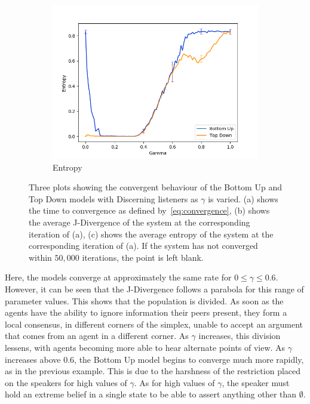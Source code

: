 \begin{figure}
\begin{subfigure}[ht]{0.45\textwidth}
    \includegraphics[width=\textwidth]{Images/Figures/BU+TD/FIE/Entropy_better.png}
    \caption{Entropy}
 \end{subfigure}

 \caption{Three plots showing the convergent behaviour of the Bottom Up and Top Down models with Discerning listeners as $\gamma$ is varied. (a) shows the time to convergence as defined by~\cref{eq:convergence}, (b) shows the average J-Divergence of the system at the corresponding iteration of (a), (c) shows the average entropy of the system at the corresponding iteration of (a). If the system has not converged within $50,000$ iterations, the point is left blank.} \label{fig:convergence_FIE}
\end{figure}



Here, the models converge at approximately the same rate for $ 0 \leq \gamma \leq 0.6$. However, it can be seen that the J-Divergence follows a parabola for this range of parameter values. This shows that the population is divided. As soon as the agents have the ability to ignore information their peers present, they form a local consensus, in different corners of the simplex, unable to accept an argument that comes from an agent in a different corner. As $\gamma$ increases, this division lessens, with agents becoming more able to hear alternate points of view. As $\gamma$ increases above $0.6$, the Bottom Up model begins to converge much more rapidly, as in the previous example. This is due to the harshness of the restriction placed on the speakers for high values of $\gamma$. As for high values of $\gamma$, the speaker must hold an extreme belief in a single state to be able to assert anything other than $\emptyset$. 


